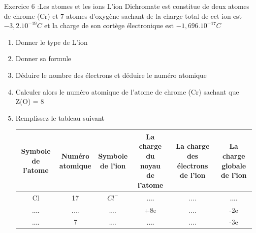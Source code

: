 \documentclass[12pt, french]{article}
\begin{document}
   \begin{Box2}{Exercice 6 :Les atomes et les ions }
	   L’ion Dichromate est constitue de deux atomes de chrome (Cr) et 7 atomes d’oxygène
	   sachant de la charge total de cet ion est $-3,2.10^{-19}C$ et la charge de son cortège
	   électronique est $-1,696.10^{-17}C$
	   \begin{enumerate}
		   \item Donner le type de L’ion
		   \item Donner sa formule
		   \item Déduire le nombre des électrons et déduire le numéro atomique
		   \item Calculer alors le numéro atomique de l’atome de chrome (Cr) sachant que Z(O) = 8
		   \item Remplissez le tableau suivant\\ 
			   \begin{center}
\begin{tabular}{ |c|c|c|c|c|c| }
	\hline
	\makecell{  Symbole \\de l’atome} & \makecell{Numéro\\ atomique} & \makecell{Symbole\\de l’ion} & \makecell{La charge \\du noyau\\de l’atome} & \makecell{La charge\\des électrons\\de l’ion} &\makecell{La charge\\globale\\de l’ion} \\\hline 
 Cl & 17 & $Cl^-$ &.... & .... & ....  \\  \hline
 .... & .... & .... &+8e & .... & -2e  \\  \hline
 .... & 7 & .... &.... & .... & -3e  \\  \hline
\end{tabular}
\end{center}
	   \end{enumerate}
   \end{Box2}
\end{document}
